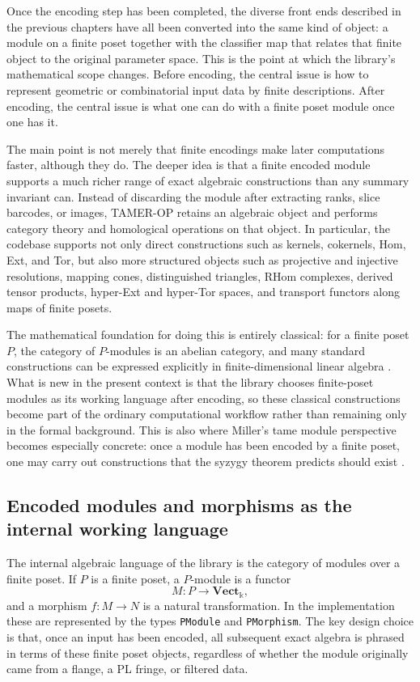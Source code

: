 \documentclass[11pt]{article}
\newcommand{\kk}{\Bbbk}
\newcommand{\TAMER}{\textsc{TAMER-OP}}
\theoremstyle{definition}
\theoremstyle{remark}
\begin{document}
Once the encoding step has been completed, the diverse front ends described in the previous chapters have all been converted into the same kind of object: a module on a finite poset together with the classifier map that relates that finite object to the original parameter space.  This is the point at which the library's mathematical scope changes.  Before encoding, the central issue is how to represent geometric or combinatorial input data by finite descriptions.  After encoding, the central issue is what one can do with a finite poset module once one has it.

The main point is not merely that finite encodings make later computations faster, although they do.  The deeper idea is that a finite encoded module supports a much richer range of exact algebraic constructions than any summary invariant can.  Instead of discarding the module after extracting ranks, slice barcodes, or images, \TAMER{} retains an algebraic object and performs category theory and homological operations on that object.  In particular, the codebase supports not only direct constructions such as kernels, cokernels, Hom, Ext, and Tor, but also more structured objects such as projective and injective resolutions, mapping cones, distinguished triangles, RHom complexes, derived tensor products, hyper-Ext and hyper-Tor spaces, and transport functors along maps of finite posets.

The mathematical foundation for doing this is entirely classical: for a finite poset $P$, the category of $P$-modules is an abelian category, and many standard constructions can be expressed explicitly in finite-dimensional linear algebra \cite{Mac98,Wei94}.  What is new in the present context is that the library chooses finite-poset modules as its working language after encoding, so these classical constructions become part of the ordinary computational workflow rather than remaining only in the formal background.  This is also where Miller's tame module perspective becomes especially concrete: once a module has been encoded by a finite poset, one may carry out constructions that the syzygy theorem predicts should exist \cite{Mil20}.

\subsection{Encoded modules and morphisms as the internal working language}

The internal algebraic language of the library is the category of modules over a finite poset.  If $P$ is a finite poset, a $P$-module is a functor
\[
M : P \longrightarrow \mathbf{Vect}_{\kk},
\]
and a morphism $f\colon M\to N$ is a natural transformation.  In the implementation these are represented by the types \texttt{PModule} and \texttt{PMorphism}.  The key design choice is that, once an input has been encoded, all subsequent exact algebra is phrased in terms of these finite poset objects, regardless of whether the module originally came from a flange, a PL fringe, or filtered data.
\end{document}
